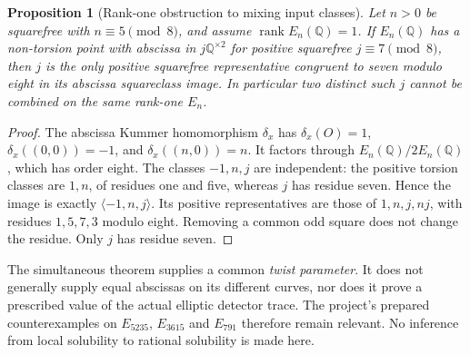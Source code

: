 \documentclass[11pt,a4paper]{article}
\newtheorem{proposition}[theorem]{Proposition}
\theoremstyle{remark}\newtheorem{remark}[theorem]{Remark}
\newcommand{\Q}{\mathbb Q}\newcommand{\Z}{\mathbb Z}\newcommand{\F}{\mathbb F}
\begin{document}
\begin{proposition}[Rank-one obstruction to mixing input classes]
Let $n>0$ be squarefree with $n\equiv5\pmod8$, and assume
$\operatorname{rank}E_n(\Q)=1$. If $E_n(\Q)$ has a non-torsion
point with abscissa in $j\Q^{\times2}$ for positive squarefree
$j\equiv7\pmod8$, then $j$ is the only positive squarefree
representative congruent to seven modulo eight in its abscissa
squareclass image. In particular two distinct such $j$ cannot be
combined on the same rank-one $E_n$.
\end{proposition}
\begin{proof}
The abscissa Kummer homomorphism $\delta_x$ has
$\delta_x(O)=1$, $\delta_x((0,0))=-1$, and
$\delta_x((n,0))=n$. It factors through $E_n(\Q)/2E_n(\Q)$,
which has order eight. The classes $-1,n,j$ are independent:
the positive torsion classes are $1,n$, of residues one and five,
whereas $j$ has residue seven. Hence the image is exactly
$\langle-1,n,j\rangle$. Its positive representatives are those of
$1,n,j,nj$, with residues $1,5,7,3$ modulo eight. Removing a common
odd square does not change the residue. Only $j$ has residue seven.
\end{proof}

The simultaneous theorem supplies a common \emph{twist parameter}.
It does not generally supply equal abscissas on its different curves,
nor does it prove a prescribed value of the actual elliptic detector
trace. The project's prepared counterexamples on $E_{5235}$,
$E_{3615}$ and $E_{791}$ therefore remain relevant. No inference
from local solubility to rational solubility is made here.
\end{document}
